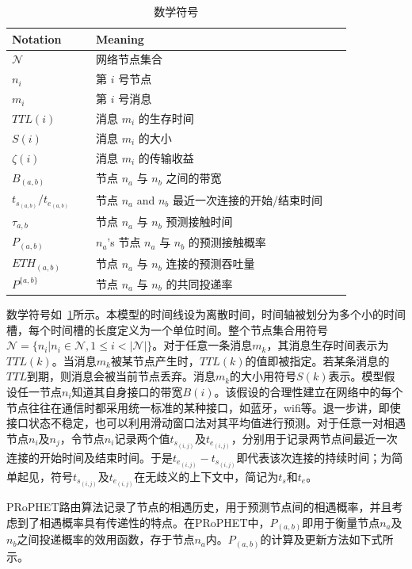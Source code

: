 \begin{table}
\centering
  \caption{数学符号}
    \label{tab:chap4_notations}
  \begin{tabular}{p{0.23\linewidth}<{\centering}p{0.7\linewidth}<{\centering}}
  \hline
    \textbf{Notation} & \textbf{Meaning}  \\
    \hline
   $\mathcal{N}$ & 网络节点集合 \\
   $n_i$ &  第 $i$ 号节点  \\
   $m_i$ &  第 $i$ 号消息 \\
   $TTL(i)$ & 消息 $m_i$ 的生存时间\\
   $S(i)$   & 消息 $m_i$ 的大小\\
    $\zeta(i)$ & 消息 $m_i$ 的传输收益\\
    $B_{(a,b)}$ & 节点 $n_a$ 与 $n_b$ 之间的带宽\\
   $t_{s_{(a,b)}}/t_{e_{(a,b)}}$   &  节点 $n_a$ and $n_b$ 最近一次连接的开始/结束时间\\
   $\tau_{a,b}$ & 节点 $n_a$ 与 $n_b$ 预测接触时间\\
  $P_{(a,b)}$ & $n_a$'s 节点 $n_a$ 与 $n_b$ 的预测接触概率 \\
  $ETH_{(a,b)}$ & 节点 $n_a$ 与 $n_b$ 连接的预测吞吐量\\
$P^{\{a,b\}}$ & 节点 $n_a$ 与 $n_b$ 的共同投递率\\
   \hline
  \end{tabular}
\end{table}

数学符号如\tablename~\ref{tab:chap4_notations}所示。本模型的时间线设为离散时间，时间轴被划分为多个小的时间槽，每个时间槽的长度定义为一个单位时间。整个节点集合用符号$\mathcal{N}=\{n_i|n_i\in\mathcal{N},1\leq i<|\mathcal{N}|\}$。对于任意一条消息$m_k$，其消息生存时间表示为$TTL(k)$。当消息$m_k$被某节点产生时，$TTL(k)$的值即被指定。若某条消息的$TTL$到期，则消息会被当前节点丢弃。消息$m_k$的大小用符号$S(k)$表示。模型假设任一节点$n_i$知道其自身接口的带宽$B(i)$。该假设的合理性建立在网络中的每个节点往往在通信时都采用统一标准的某种接口，如蓝牙，wifi等。退一步讲，即使接口状态不稳定，也可以利用滑动窗口法对其平均值进行预测。对于任意一对相遇节点$n_i$及$n_j$，令节点$n_i$记录两个值$t_{s_{(i,j)}}$及$t_{e_{(i,j)}}$，分别用于记录两节点间最近一次连接的开始时间及结束时间。于是$t_{e_{(i,j)}}-t_{s_{(i,j)}}$即代表该次连接的持续时间；为简单起见，符号$t_{s_{(i,j)}}$及$t_{e_{(i,j)}}$在无歧义的上下文中，简记为$t_s$和$t_e$。

PRoPHET路由算法记录了节点的相遇历史，用于预测节点间的相遇概率，并且考虑到了相遇概率具有传递性的特点。在PRoPHET中，$P_{(a,b)}$即用于衡量节点$n_a$及$n_b$之间投递概率的效用函数，存于节点$n_a$内。$P_{(a,b)}$的计算及更新方法如下式所示。

